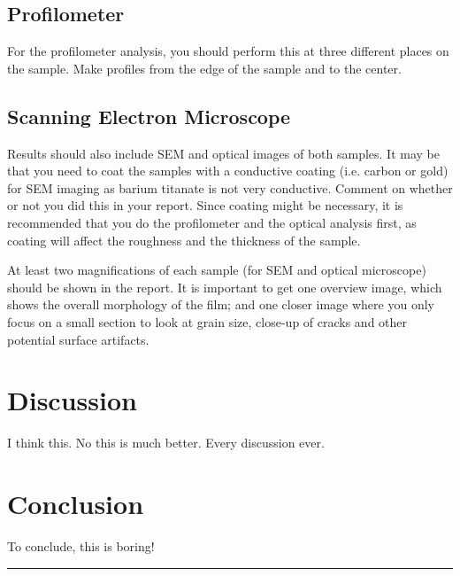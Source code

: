 \documentclass[5p,sort&compress]{elsarticle}
\begin{document}
\subsection{Profilometer}

For the profilometer analysis, you should perform this at three different places on the sample. Make profiles from the edge of the sample and to the center.

\subsection{Scanning Electron Microscope}

Results should also include SEM and optical images of both samples. It may be that you need to coat the samples with a conductive coating (i.e. carbon or gold) for SEM imaging as barium titanate is not very conductive. Comment on whether or not you did this in your report. Since coating might be necessary, it is recommended that you do the profilometer and the optical analysis first, as coating will affect the roughness and the thickness of the sample.

At least two magnifications of each sample (for SEM and optical microscope) should be shown in the report. It is important to get one overview image, which shows the overall morphology of the film; and one closer image where you only focus on a small section to look at grain size, close-up of cracks and other potential surface artifacts.

\section{Discussion}

\noindent I think this. No this is much better. Every discussion ever.

\section{Conclusion}

\noindent To conclude, this is boring!






\begingroup
\begin{center}
  \rule{2cm}{.4pt}
\end{center}
\makeatletter
{}
\makeatother



\endgroup
\end{document}
